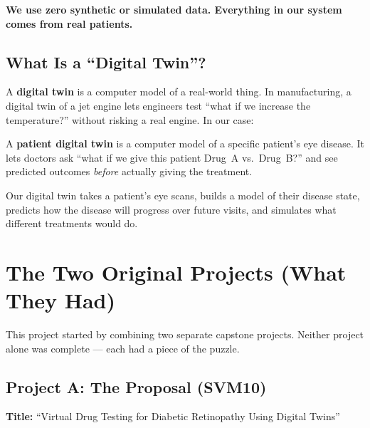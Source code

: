 \documentclass[12pt,a4paper]{article}
\begin{document}
\textbf{We use zero synthetic or simulated data. Everything in our system comes from real patients.}

\subsection{What Is a ``Digital Twin''?}

A \textbf{digital twin} is a computer model of a real-world thing. In manufacturing, a digital twin of a jet engine lets engineers test ``what if we increase the temperature?'' without risking a real engine. In our case:

\begin{mdframed}[style=keypoint]
A \textbf{patient digital twin} is a computer model of a specific patient's eye disease. It lets doctors ask ``what if we give this patient Drug~A vs.\ Drug~B?'' and see predicted outcomes \emph{before} actually giving the treatment.
\end{mdframed}

Our digital twin takes a patient's eye scans, builds a model of their disease state, predicts how the disease will progress over future visits, and simulates what different treatments would do.


\section{The Two Original Projects (What They Had)}

This project started by combining two separate capstone projects. Neither project alone was complete --- each had a piece of the puzzle.

\subsection{Project A: The Proposal (SVM10)}

\textbf{Title:} ``Virtual Drug Testing for Diabetic Retinopathy Using Digital Twins''
\end{document}
